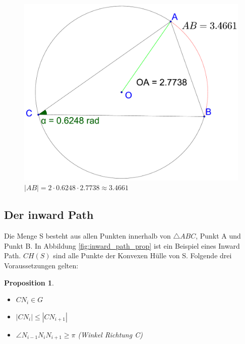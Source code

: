 \documentclass[a4paper,twoside]{IEEEtran}
\newtheorem{inwardPathProposition}{Proposition}
\begin{document}
\begin{figure}[h!]
\centering
\includegraphics[width=1\linewidth]{bogen_gleich_winkel_mal_strecke.eps}
\caption{$|AB| = 2\cdot 0.6248 \cdot 2.7738 \approx 3.4661 $} %
\label{fig:winkel_mal_strecke}
\end{figure}








\subsection{Der inward Path}
Die Menge S besteht aus allen Punkten innerhalb von $\triangle {ABC} $, Punkt A und Punkt B.
In Abbildung \ref{fig:inward_path_prop} ist ein Beispiel eines Inward Path.
$CH(S) $ sind alle Punkte der Konvexen Hülle von S. %
Folgende drei Voraussetzungen gelten:
\begin{inwardPathProposition}
\begin{itemize} %
	\item $CN_i \in G$
	\item $|CN_i| \leq |CN_{i+1}| $
	\item $\angle{N_{i-1}N_iN_{i+1}} \geq \pi $ (Winkel Richtung C)
\end{itemize} 
\end{inwardPathProposition}
\end{document}
